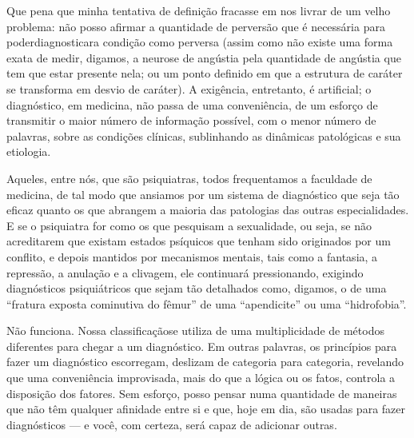Que pena que minha tentativa de definição fracasse em nos livrar de
um velho problema: não posso afirmar a quantidade de perversão que é
necessária para poder\idxpervdiagn[|(] diagnosticar\idxdiag[|(] a condição como perversa (assim como
não existe uma forma exata de medir, digamos, a neurose de angústia
pela quantidade de angústia que tem que estar presente nela; ou um
ponto definido em que a estrutura de caráter se transforma em desvio de
caráter). A exigência, entretanto, é artificial; o diagnóstico, em
medicina, não passa de uma conveniência, de um esforço de transmitir o
maior número de informação possível, com o menor número de palavras,
sobre as condições clínicas, sublinhando as dinâmicas patológicas e sua
etiologia.

Aqueles, entre nós, que são psiquiatras, todos frequentamos a
faculdade de medicina, de tal modo que ansiamos por um sistema de
diagnóstico que seja tão eficaz quanto os que abrangem a maioria das
patologias das outras especialidades. E se o psiquiatra for como os que
pesquisam a sexualidade, ou seja, se não acreditarem que existam
estados psíquicos que tenham sido originados por um conflito, e depois
mantidos por mecanismos mentais, tais como a fantasia, a repressão, a
anulação e a clivagem, ele continuará pressionando, exigindo
diagnósticos psiquiátricos que sejam tão detalhados como, digamos, o
de uma ``fratura exposta cominutiva do fêmur'' de uma ``apendicite''
ou uma ``hidrofobia''.

Não funciona. Nossa classificação\idxclass[|(] se utiliza de uma multiplicidade
de métodos diferentes para chegar a um diagnóstico. Em outras palavras,
os princípios para fazer um diagnóstico escorregam, deslizam de
categoria para categoria, revelando que uma conveniência improvisada,
mais do que a lógica ou os fatos, controla a disposição dos fatores.
Sem esforço, posso pensar numa quantidade de maneiras que não têm
qualquer afinidade entre si e que, hoje em dia, são usadas para fazer
diagnósticos --- e você, com certeza, será capaz de adicionar outras.


